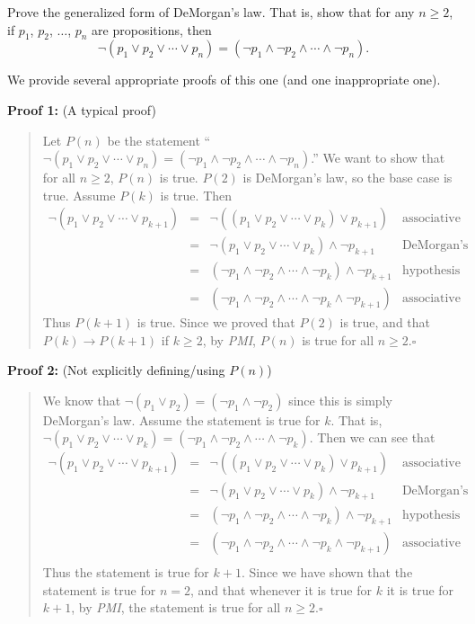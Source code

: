 \begin{exa}
Prove the generalized form of DeMorgan's law.  That is, show that
for any $n\geq 2$, if $p_1$, $p_2$, $\ldots$, $p_n$ are propositions, then 
$$\neg(p_1\vee p_2 \vee\cdots\vee p_n)=(\neg p_1\wedge \neg p_2 \wedge \cdots\wedge\neg p_n).$$

We provide several appropriate proofs of this one (and one inappropriate one).

\medskip
\noindent
{\bf Proof 1:} (A typical proof)
\begin{quote}
Let $P(n)$ be the statement
``$\neg(p_1\vee p_2 \vee\cdots\vee p_n)=(\neg p_1\wedge \neg p_2 \wedge \cdots\wedge\neg p_n)$.''
We want to show that for all $n\geq 2$, $P(n)$ is true.
$P(2)$ is DeMorgan's law, so the base case is true.
Assume $P(k)$ is true.  Then 
$$
\begin{array}{llll}
\neg(p_1\vee p_2 \vee\cdots\vee p_{k+1})
&=&
\neg((p_1\vee p_2 \vee\cdots\vee p_{k})\vee p_{k+1})
&\mbox{associative law}\\
&=&
\neg(p_1\vee p_2 \vee\cdots\vee p_{k})\wedge \neg p_{k+1}
&\mbox{DeMorgan's law}\\
&=&
(\neg p_1\wedge \neg p_2 \wedge \cdots\wedge\neg p_{k})\wedge \neg p_{k+1}
&\mbox{hypothesis}\\
&=&
(\neg p_1\wedge \neg p_2 \wedge \cdots\wedge\neg p_{k}\wedge \neg p_{k+1})
&\mbox{associative law}
\end{array}
$$
Thus $P(k+1)$ is true.
Since we proved that $P(2)$ is true, and that
$P(k)\rightarrow P(k+1)$ if $k\geq 2$,
by {\em PMI}, $P(n)$ is true for all $n\geq 2$.\hfill$\square$
\end{quote}

\noindent
{\bf Proof 2:} (Not explicitly defining/using $P(n)$)
\begin{quote}
We know that 
$\neg(p_1\vee p_2)=(\neg p_1\wedge \neg p_2)$ since
this is simply DeMorgan's law.
Assume the statement is true for $k$.  That is, 
$\neg(p_1\vee p_2 \vee\cdots\vee p_{k})=
(\neg p_1\wedge \neg p_2 \wedge \cdots\wedge\neg p_{k})$.
Then we can see that 
$$
\begin{array}{llll}
\neg(p_1\vee p_2 \vee\cdots\vee p_{k+1})
&=&
\neg((p_1\vee p_2 \vee\cdots\vee p_{k})\vee p_{k+1})
&\mbox{associative law}\\
&=&
\neg(p_1\vee p_2 \vee\cdots\vee p_{k})\wedge \neg p_{k+1}
&\mbox{DeMorgan's law}\\
&=&
(\neg p_1\wedge \neg p_2 \wedge \cdots\wedge\neg p_{k})\wedge \neg p_{k+1}
&\mbox{hypothesis}\\
&=&
(\neg p_1\wedge \neg p_2 \wedge \cdots\wedge\neg p_{k}\wedge \neg p_{k+1})
&\mbox{associative law}\\
\end{array}
$$
Thus the statement is true for $k+1$. Since we have shown that the
statement is true for $n=2$, and that whenever it is true for $k$ it
is true for $k+1$, 
by {\em PMI}, the statement is true for all $n\geq 2$.\hfill$\square$


\end{quote}
\end{exa}
